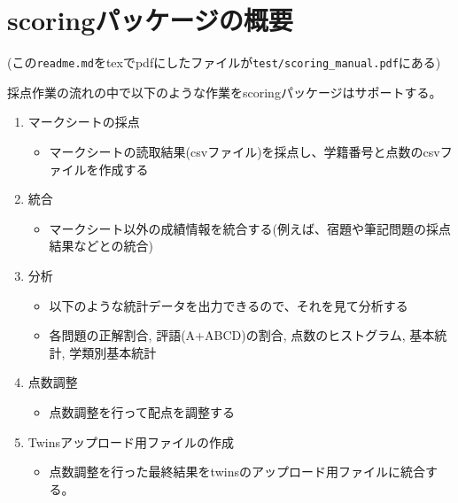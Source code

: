 \def\latexktupreamblefile{scoring_manual.ktu_preamble}
\def\mytitle{scoringパッケージ}
\def\myauthor{山本}
\def\mydate{2019.6.25}
\def\latexxspacing{no}


\newcommand {\mycolor }{olive}

\section{scoringパッケージの概要}
\label{scoringパッケージの概要}

(この\texttt{readme.md}をtexでpdfにしたファイルが\texttt{test\slash scoring\_manual.pdf}にある)

採点作業の流れの中で以下のような作業をscoringパッケージはサポートする。

\begin{enumerate}
\item マークシートの採点

\begin{itemize}
\item マークシートの読取結果(csvファイル)を採点し、学籍番号と点数のcsvファイルを作成する

\end{itemize}

\item 統合

\begin{itemize}
\item マークシート以外の成績情報を統合する(例えば、宿題や筆記問題の採点結果などとの統合)

\end{itemize}

\item 分析

\begin{itemize}
\item 以下のような統計データを出力できるので、それを見て分析する

\item 各問題の正解割合, 評語(A+ABCD)の割合, 点数のヒストグラム, 基本統計, 学類別基本統計

\end{itemize}

\item 点数調整

\begin{itemize}
\item 点数調整を行って配点を調整する

\end{itemize}

\item Twinsアップロード用ファイルの作成

\begin{itemize}
\item 点数調整を行った最終結果をtwinsのアップロード用ファイルに統合する。

\end{itemize}

\end{enumerate}


